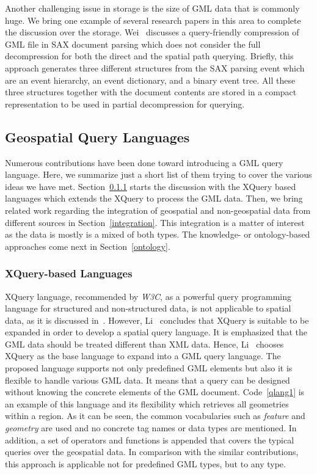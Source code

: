 \documentclass[a4paper,12pt]{article}
\begin{document}
Another challenging issue in storage is the size of GML data that is commonly huge. 
We bring one example of several research papers in this area to complete the discussion over the storage.
Wei~\cite{Wei2011} discusses a query-friendly compression of GML file in SAX document 
parsing which does not consider the full decompression for both the direct and the spatial path querying. 
Briefly, this approach generates three different structures from the SAX parsing event
which are an event hierarchy, an event dictionary, and a binary event tree.
All these three structures together with the document contents are stored in a compact
representation to be used in partial decompression for querying.%

\subsection{Geospatial Query Languages}
\label{queryLang}
Numerous contributions have been done toward introducing a GML query language.
Here, we summarize just a short list of them trying to cover the various ideas we have met. %
Section~\ref{xquery-based} starts the discussion with the XQuery based languages which extends the XQuery
to process the GML data.
Then, we bring related work regarding the integration of geospatial and non-geospatial
data from different sources in Section~\ref{integration}. This integration is a matter of interest
as the data is mostly is a mixed of both types. The knowledge- or ontology-based approaches 
come next in Section~\ref{ontology}.

\subsubsection{XQuery-based Languages}
\label{xquery-based}
XQuery language, recommended by \emph{W3C}, as a powerful query programming language for structured and non-structured data, 
is not applicable to spatial data, as it is discussed in~\cite{Lisa2006,Chen2010}. 
However, Li~\cite{Lisa2006} concludes that XQuery is suitable to be expanded in order to develop a spatial query language.
It is emphasized that the GML data should be treated different than XML data. Hence, Li~\cite{Lisa2006} chooses XQuery as the base language to expand into a GML query language. The proposed language supports not only predefined GML elements but also it is flexible to handle various GML data. 
It means that a query can be designed without knowing the concrete elements of the GML document.
Code~\ref{qlang1} is an example of this language and its flexibility
which retrieves all geometries within a region. As it can be seen, 
the common vocabularies such as \textit{feature} and \textit{geometry} are used and no concrete tag names or data types are mentioned.
In addition, a set of operators and functions is appended that covers the typical queries over the geospatial data. 
In comparison with the similar contributions, this approach is applicable not for predefined GML types, but to any type.
\end{document}
